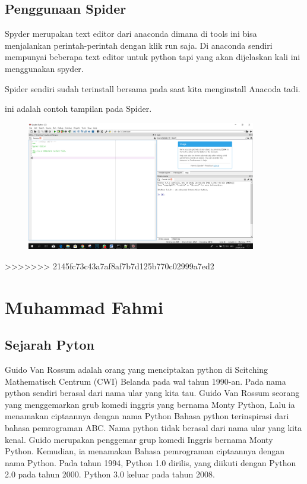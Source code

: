 \subsection{Penggunaan Spider}
Spyder merupakan text editor dari anaconda dimana di tools ini bisa menjalankan perintah-perintah dengan klik run saja. 
Di anaconda sendiri mempunyai beberapa text editor untuk python tapi yang akan dijelaskan kali ini menggunakan spyder.

Spider sendiri sudah terinstall bersama pada saat kita menginstall Anacoda tadi.

ini adalah contoh tampilan pada Spider.
\begin{figure}[H]
		\includegraphics[width=10cm]{figures/fahmi/3.png}
		\centering
	\end{figure}
>>>>>>> 2145fc73c43a7af8af7b7d125b770c02999a7ed2


\section{Muhammad Fahmi}

\subsection{Sejarah Pyton}
Guido Van Rossum adalah orang yang menciptakan python di Scitching Mathematisch Centrum (CWI) Belanda pada wal tahun 1990-an. 
Pada nama python sendiri berasal dari nama ular yang kita tau. Guido Van Rossum seorang yang menggemarkan grub komedi inggris yang bernama Monty Python, Lalu ia menamakan ciptaannya dengan nama Python
Bahasa python terinspirasi dari bahasa pemrograman ABC. Nama python tidak berasal dari nama ular yang kita kenal. Guido merupakan penggemar grup komedi Inggris bernama Monty Python. Kemudian, ia menamakan Bahasa pemrograman ciptaannya dengan nama Python.
Pada tahun 1994, Python 1.0 dirilis, yang diikuti dengan Python 2.0 pada tahun 2000. Python 3.0 keluar pada tahun 2008.

